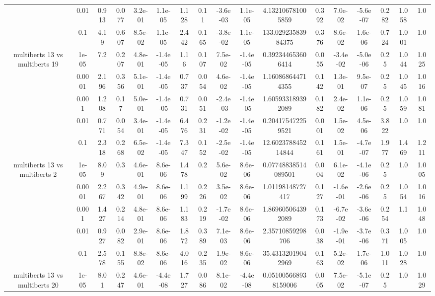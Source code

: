 \begin{tabular}{|c|c|c|c|c|c|c|c|c|c|c|c|c|c|c|c|c|}
 & 0.01 & 0.913 & 0.077 & 3.2e-01 & 1.1e-05 & 1.128 & 0.11 & -3.6e-03 & 1.1e-05 & 4.132106781005859 & 0.392 & 7.0e-02 & -5.6e-07 & 0.282 & 1.058 & 1.0 \\
 & 0.1 & 4.19 & 0.607 & 8.5e-02 & 1.1e-05 & 2.442 & 0.165 & -3.8e-02 & 1.1e-05 & 133.02923583984375 & 0.376 & 8.6e-02 & 1.6e-06 & 0.724 & 1.001 & 1.0 \\
\hline
\multirow{5}{*}{multiberts 13 vs multiberts 19} & 1e-05 & 7.2 & 0.207 & 4.8e-01 & -1.4e-05 & 1.16 & 0.107 & 7.5e-02 & -1.4e-05 & 0.392344653606414 & 0.055 & -3.4e-02 & -5.0e-06 & 0.25 & 1.044 & 1.025 \\
 & 0.0001 & 2.196 & 0.356 & 5.1e-01 & -1.4e-05 & 0.737 & 0.054 & 4.6e-02 & -1.4e-05 & 1.160868644714355 & 0.142 & 1.3e-01 & 9.5e-07 & 0.25 & 1.045 & 1.016 \\
 & 0.001 & 1.208 & 0.17 & 5.0e-01 & -1.4e-05 & 0.731 & 0.051 & -2.4e-03 & -1.4e-05 & 1.605933189392089 & 0.182 & 2.4e-02 & 1.1e-06 & 0.25 & 1.059 & 1.081 \\
 & 0.01 & 0.771 & 0.054 & 3.4e-01 & -1.4e-05 & 6.476 & 0.231 & -1.2e-02 & -1.4e-05 & 0.204175472259521 & 0.001 & 1.5e-02 & 4.5e-06 & 3.822 & 1.0 & 1.0 \\
 & 0.1 & 2.318 & 0.268 & 6.5e-02 & -1.4e-05 & 7.347 & 0.152 & -2.5e-02 & -1.4e-05 & 12.602378845214844 & 0.161 & 1.5e-01 & -4.7e-07 & 1.977 & 1.469 & 1.211 \\
\hline
\multirow{5}{*}{multiberts 13 vs multiberts 2} & 1e-05 & 8.09 & 0.3 & 4.6e-01 & 8.6e-06 & 1.478 & 0.2 & 5.6e-02 & 8.6e-06 & 0.07748838514089501 & 0.004 & 6.1e-02 & -4.1e-06 & 0.25 & 1.0 & 1.005 \\
 & 0.0001 & 2.267 & 0.342 & 4.9e-01 & 8.6e-06 & 1.199 & 0.226 & 3.5e-02 & 8.6e-06 & 1.01198148727417 & 0.127 & -1.6e-01 & -2.6e-06 & 0.25 & 1.054 & 1.016 \\
 & 0.001 & 1.427 & 0.214 & 4.8e-01 & 8.6e-06 & 1.183 & 0.219 & -1.7e-02 & 8.6e-06 & 1.869605064392089 & 0.173 & -6.7e-02 & -3.6e-06 & 0.254 & 1.1 & 1.048 \\
 & 0.01 & 0.927 & 0.082 & 2.9e-01 & 8.6e-06 & 1.872 & 0.389 & 7.1e-03 & 8.6e-06 & 2.35710859298706 & 0.038 & -1.9e-01 & -3.7e-06 & 0.371 & 1.005 & 1.0 \\
 & 0.1 & 2.578 & 0.155 & 8.8e-02 & 8.6e-06 & 4.016 & 0.235 & 1.9e-02 & 8.6e-06 & 35.43132019042969 & 0.163 & 5.2e-02 & 1.7e-06 & 1.011 & 1.028 & 1.0 \\
\hline
\multirow{5}{*}{multiberts 13 vs multiberts 20} & 1e-05 & 8.01 & 0.247 & 4.6e-01 & -4.4e-08 & 1.727 & 0.086 & 8.1e-02 & -4.4e-08 & 0.051005668938159006 & 0.005 & 7.5e-02 & -5.1e-07 & 0.25 & 1.0 & 1.029 \\

\end{tabular}
